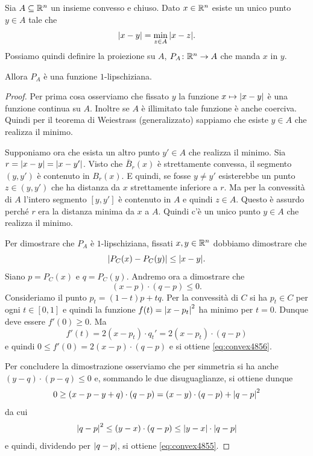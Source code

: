 \begin{theorem}
Sia $A\subseteq {\mathbb R}^n$ un insieme convesso e chiuso.
Dato $x\in {\mathbb R}^n$ esiste un unico punto $y\in A$ tale che
\[
    {\left|x-y\right|} = \min_{z\in A} {\left|x-z\right|}.
\]
Possiamo quindi definire la proiezione su $A$, $P_A\colon {\mathbb R}^n \to A$
che manda $x$ in $y$.

Allora $P_A$ è una funzione $1$-lipschiziana.
\end{theorem}
%
\begin{proof}
Per prima cosa osserviamo che fissato $y$ la funzione $x\mapsto {\left|x-y\right|}$ 
è una funzione continua su $A$.
Inoltre se $A$ è illimitato tale funzione è anche coerciva. 
Quindi per il teorema di Weiestrass (generalizzato) sappiamo che esiste $y\in A$ 
che realizza il minimo.

Supponiamo ora che esista un altro punto $y'\in A$ che realizza il minimo.
Sia $r = {\left|x-y\right|} = {\left|x-y'\right|}$.
Visto che $\bar B_r(x)$ è strettamente convessa, 
il segmento $(y,y')$ è contenuto in $B_r(x)$.
E quindi, se fosse $y\neq y'$ 
esisterebbe un punto $z\in (y,y')$ che ha 
distanza da $x$ strettamente inferiore a $r$.
Ma per la convessità di $A$ l'intero segmento $[y,y']$ 
è contenuto in $A$ e quindi $z\in A$.
Questo è assurdo perché $r$ era la distanza minima
da $x$ a $A$.
Quindi c'è un unico punto $y\in A$ che realizza il minimo.

Per dimostrare che $P_A$ è $1$-lipschiziana, 
fissati $x, y \in {\mathbb R}^n$ dobbiamo 
dimostrare che 
\begin{equation}\label{eq:convex4855}
  {\left|P_C(x) - P_C(y)\right|} \le {\left|x-y\right|}.
\end{equation}
Siano $p=P_C(x)$ e $q=P_C(y)$. 
Andremo ora a dimostrare che 
\begin{equation}\label{eq:convex4856}
  (x-p)\cdot (q-p) \le 0.
\end{equation}
Consideriamo il punto $p_t = (1-t) p + t q$.
Per la convessità di $C$ si ha $p_t \in C$ 
per ogni $t\in [0,1]$ e quindi 
la funzione $f(t) = {\left|x-p_t\right|}^2$
ha minimo per $t=0$. 
Dunque deve essere $f'(0)\ge 0$. 
Ma  
\[ 
 f'(t) = 2 (x-p_t)\cdot q_t'
  = 2 (x-p_t)\cdot (q-p)
\]
e quindi $0\le f'(0) = 2 (x-p)\cdot (q-p)$
e si ottiene \eqref{eq:convex4856}.

Per concludere la dimostrazione osserviamo che
per simmetria si ha anche $(y-q)\cdot (p-q) \le 0$
e, sommando le due disuguaglianze, si ottiene 
dunque 
\[
 0 \ge (x - p - y + q)\cdot (q-p)
  = (x-y)\cdot (q-p) + {\left|q-p\right|}^2
\]
da cui
\[
    {\left|q-p\right|}^2 \le (y-x)\cdot (q-p) \le {\left|y-x\right|}\cdot {\left|q-p\right|}
\]
e quindi, dividendo per ${\left|q-p\right|}$, si ottiene \eqref{eq:convex4855}.
\end{proof}


